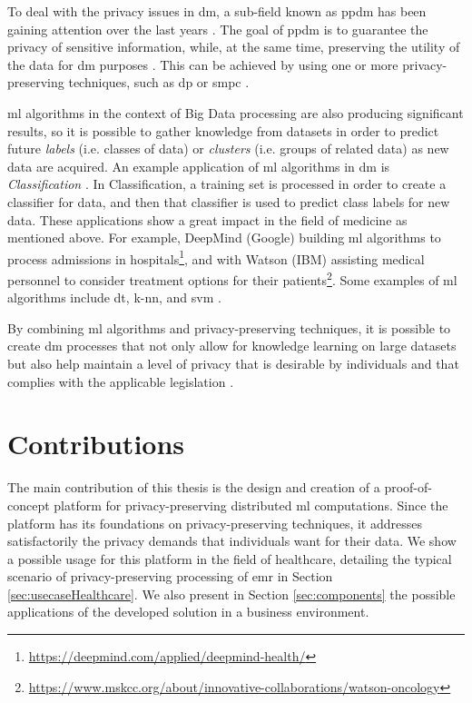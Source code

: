 To deal with the privacy issues in \ac{dm}, a sub-field known as \ac{ppdm} has been gaining attention over the last years \cite{DAcquisto2015}. The goal of \ac{ppdm} is to guarantee the privacy of sensitive information, while, at the same time, preserving the utility of the data for \ac{dm} purposes \cite{agrawal2000privacy}.
This can be achieved by using one or more privacy-preserving techniques, such as \ac{dp} \cite{Danezis2015} or \ac{smpc} \cite{DAcquisto2015}.


\ac{ml} algorithms in the context of Big Data processing are also producing significant results, so it is possible to gather knowledge from datasets in order to predict future \emph{labels} (i.e. classes of data) or \emph{clusters} (i.e. groups of related data) as new data are acquired. An example application of \ac{ml} algorithms in \ac{dm} is \textit{Classification} \cite{LeiXu2014}. In Classification, a training set is processed in order to create a classifier for data, and then that classifier is used to predict class labels for new data. These applications show a great impact in the field of medicine as mentioned above. For example, DeepMind (Google) building \ac{ml} algorithms to process admissions in hospitals\footnote{\url{https://deepmind.com/applied/deepmind-health/}}, and with Watson (IBM) assisting medical personnel to consider treatment options for their patients\footnote{\url{https://www.mskcc.org/about/innovative-collaborations/watson-oncology}}.
Some examples of \ac{ml} algorithms include \ac{dt}, \ac{k-nn}, and \ac{svm} \cite{LeiXu2014}.

By combining \ac{ml} algorithms and privacy-preserving techniques, it is possible to create \ac{dm} processes that not only allow for knowledge learning on large datasets but also help maintain a level of privacy that is desirable by individuals and that complies with the applicable legislation \cite{DAcquisto2015}.



\section{Contributions}
\label{sec:Intro_Contributions}

The main contribution of this thesis is the design and creation of a proof-of-concept platform for privacy-preserving distributed \ac{ml} computations. Since the platform has its foundations on privacy-preserving techniques, it addresses satisfactorily the privacy demands that individuals want for their data.
We show a possible usage for this platform in the field of healthcare, detailing the typical scenario of privacy-preserving processing of \ac{emr} in Section \ref{sec:usecaseHealthcare}. 
We also present in Section \ref{sec:components} the possible applications of the developed solution in a business environment.

